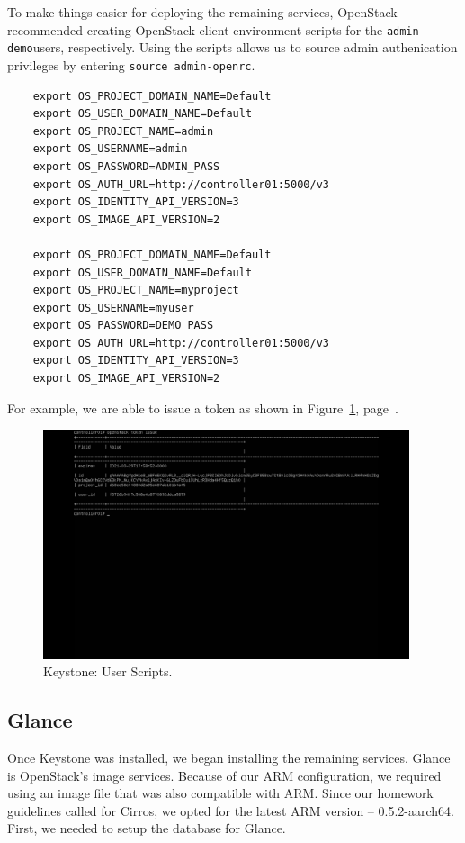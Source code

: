 \documentclass{article}
\begin{document}
To make things easier for deploying the remaining services, OpenStack recommended creating OpenStack client environment scripts for the \texttt{admin} \texttt{demo}users, respectively. Using the scripts allows us to source admin authenication privileges by entering \texttt{source admin-openrc}.

\begin{verbatim}
    export OS_PROJECT_DOMAIN_NAME=Default
    export OS_USER_DOMAIN_NAME=Default
    export OS_PROJECT_NAME=admin
    export OS_USERNAME=admin
    export OS_PASSWORD=ADMIN_PASS
    export OS_AUTH_URL=http://controller01:5000/v3
    export OS_IDENTITY_API_VERSION=3
    export OS_IMAGE_API_VERSION=2

    export OS_PROJECT_DOMAIN_NAME=Default
    export OS_USER_DOMAIN_NAME=Default
    export OS_PROJECT_NAME=myproject
    export OS_USERNAME=myuser
    export OS_PASSWORD=DEMO_PASS
    export OS_AUTH_URL=http://controller01:5000/v3
    export OS_IDENTITY_API_VERSION=3
    export OS_IMAGE_API_VERSION=2
\end{verbatim}

For example, we are able to issue a token as shown in Figure~\ref{fig:Scripts}, page~\pageref{fig:Scripts}.

\begin{figure}[ht]
    \centering
    \includegraphics[width=0.96\textwidth]{Scripts.png}
    \caption{Keystone: User Scripts.}
    \label{fig:Scripts}
\end{figure}

\subsection{Glance}
Once Keystone was installed, we began installing the remaining services. Glance is OpenStack's image services. Because of our ARM configuration, we required using an image file that was also compatible with ARM. Since our homework guidelines called for Cirros, we opted for the latest ARM version -- 0.5.2-aarch64. First, we needed to setup the database for Glance.
\end{document}
